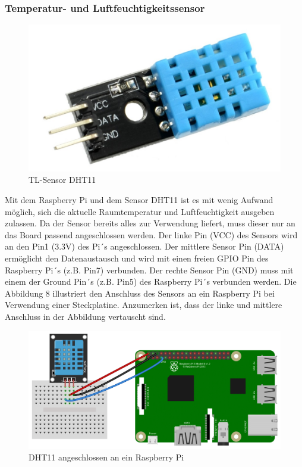 \subsubsection{Temperatur- und Luftfeuchtigkeitssensor}
\begin{figure}[H]
	\includegraphics[trim=0mm 0mm 0mm 0mm, scale=0.3]{bilder/DHT11.jpg}
	\caption{TL-Sensor DHT11}
\end{figure}
Mit dem Raspberry Pi und dem Sensor DHT11 ist es mit wenig Aufwand möglich, sich die aktuelle Raumtemperatur und Luftfeuchtigkeit ausgeben zulassen. Da der Sensor bereits alles zur Verwendung liefert, muss dieser nur an das Board passend angeschlossen werden. Der linke Pin (VCC) des Sensors wird an den Pin1 (3.3V) des Pi´s angeschlossen. Der mittlere Sensor Pin (DATA)  ermöglicht den Datenaustausch und wird mit einen freien GPIO Pin des Raspberry Pi´s (z.B. Pin7) verbunden. Der rechte Sensor Pin (GND) muss mit einem der Ground Pin´s (z.B. Pin5) des Raspberry Pi´s verbunden werden. Die Abbildung 8 illustriert den Anschluss des Sensors an ein Raspberry Pi bei Verwendung einer Steckplatine. Anzumerken ist, dass der linke und mittlere Anschluss in der Abbildung vertauscht sind.
\begin{figure}[H]
	\includegraphics[trim=0mm 0mm 0mm 0mm, scale=1]{bilder/DHT11-on-the-Raspberry-Pi.png}
	\caption{DHT11 angeschlossen an ein Raspberry Pi}
\end{figure}

